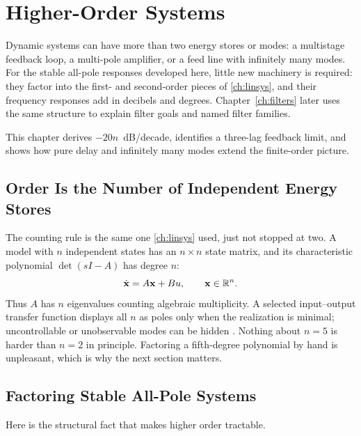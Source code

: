 \chapter{Higher-Order Systems}
\label{ch:highorder}
Dynamic systems can have more than two energy stores or modes: a multistage feedback
loop, a multi-pole amplifier, or a feed line with infinitely many modes. For the
stable all-pole responses developed here, little new machinery is required: they
factor into the first- and second-order pieces of \cref{ch:linsys}, and their
frequency responses add in decibels and degrees. Chapter~\ref{ch:filters} later
uses the same structure to explain filter goals and named filter families.

This chapter derives \(-20n\)~dB/decade, identifies a three-lag feedback limit,
and shows how pure delay and infinitely many modes extend the finite-order picture.

\section{Order Is the Number of Independent Energy Stores}
The counting rule is the same one \cref{ch:linsys} used, just not stopped at two. A
model with \(n\) independent states has an \(n\times n\) state matrix, and its
characteristic polynomial \(\det(sI-A)\) has degree \(n\):
\[
\dot{\mathbf{x}}=A\mathbf{x}+Bu,
\qquad
\mathbf{x}\in\mathbb{R}^n .
\]
Thus \(A\) has \(n\) eigenvalues counting algebraic multiplicity. A selected
input--output transfer function displays all \(n\) as poles only when the
realization is minimal; uncontrollable or unobservable modes can be hidden
\cite[pp.~199--203, 264--266]{leigh2012control}.
Nothing about \(n=5\) is harder than \(n=2\) in principle. Factoring a fifth-degree
polynomial by hand is unpleasant, which is why the next section matters.

\section{Factoring Stable All-Pole Systems}
\label{sec:factoring}
Here is the structural fact that makes higher order tractable.

